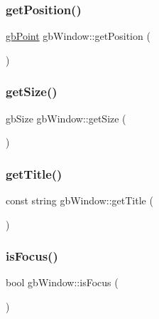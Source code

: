 \mbox{\label{classgb_window_a694817c835e86e52cb18c5d70726ca1c}} 
\subsubsection{\texorpdfstring{getPosition()}{getPosition()}}
{\footnotesize\ttfamily \mbox{\hyperlink{classgb_point}{gb\+Point}} gb\+Window\+::get\+Position (\begin{DoxyParamCaption}{ }\end{DoxyParamCaption})}

\mbox{\label{classgb_window_a0a5f9d324a9d81167d9e7b1721587ec4}} 
\subsubsection{\texorpdfstring{getSize()}{getSize()}}
{\footnotesize\ttfamily gb\+Size gb\+Window\+::get\+Size (\begin{DoxyParamCaption}{ }\end{DoxyParamCaption})}

\mbox{\label{classgb_window_a470388bdcea1c7ed3ee77ddb9ecb5a46}} 
\subsubsection{\texorpdfstring{getTitle()}{getTitle()}}
{\footnotesize\ttfamily const string gb\+Window\+::get\+Title (\begin{DoxyParamCaption}{ }\end{DoxyParamCaption})}

\mbox{\label{classgb_window_abda1af6601c41ace2731cfeff9312927}} 
\subsubsection{\texorpdfstring{isFocus()}{isFocus()}}
{\footnotesize\ttfamily bool gb\+Window\+::is\+Focus (\begin{DoxyParamCaption}{ }\end{DoxyParamCaption})}

